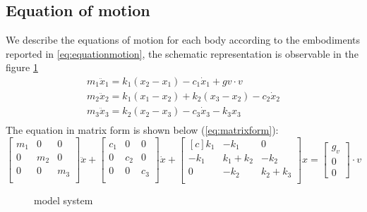 \subsection{Equation of motion}
\label{subsec:equationofomotion}
We describe the equations of motion for each body according to the embodiments 
reported in \eqref{eq:equationmotion}, the schematic representation is 
observable in the figure \ref{fig:modelscheme}
%
\begin{equation}
	\label{eq:equationmotion}
	\begin{array}{l}
		m_1 \ddot{x}_{1} = k_1 (x_2 - x_1) - c_1 \dot{x}_{1} + gv \cdot v	\\
		m_2 \ddot{x}_{2} = k_1 (x_1 - x_2) + k_2 (x_3 - x_2) - c_2 \dot{x}_{2} \\
		m_3 \ddot{x}_{3} = k_2 (x_2 - x_3) - c_3 \dot{x}_{3} - k_3 x_3	\\
	\end{array}
\end{equation}
%
The equation in matrix form is shown below (\ref{eq:matrixform}):
%
\begin{equation}
	\label{eq:matrixform}
	\begin{bmatrix}
		m_1	&  	0	&	0	\\
 		0	& 	m_2	&	0	\\
 		0	&  	0	&	m_3	\\
	\end{bmatrix} 
	\ddot{x}+
	\begin{bmatrix}
		c_1	&	0	&	0	\\
  		0	&	c_2	&  	0	\\
  		0	&	0	& 	c_3	\\
	\end{bmatrix}
	\dot{x}+
	\begin{bmatrix*}[c]
		k_1		&	-k_1			&       0	\\
 		-k_1		& 	k_1 + k_2	&     -k_2	\\
  		0		&	-k_2			& k_2 + k_3	\\
	 \end{bmatrix*}
 	x=\begin{bmatrix}
 	g_v	\\
 	0 	\\
 	0
 	\end{bmatrix} \cdot v
\end{equation}
%
\begin{figure}[hb]
	\centering
    \resizebox{.8\linewidth}{!}{}
	\caption{model system}
	\label{fig:modelscheme}
\end{figure}
